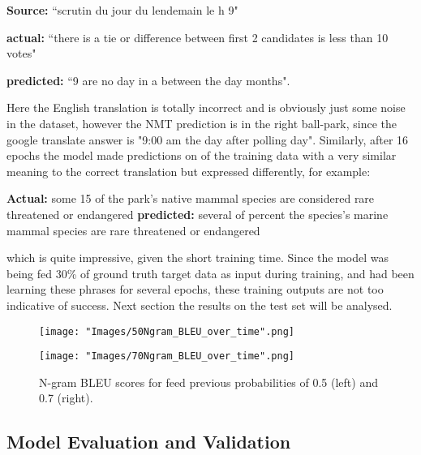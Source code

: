 \documentclass[]{article}
\begin{document}
\begin{center}
	\textbf{Source:} ``scrutin du jour du lendemain le h 9" 
	
	\textbf{actual:} ``there is a tie or difference between first 2 candidates is less than 10 votes" 
	
	\textbf{predicted:}  ``9 are no day in a between the day months".

\end{center}
Here the English translation is totally incorrect and is obviously just some noise in the dataset, however the NMT prediction is in the right ball-park, since the google translate answer is "9:00 am the day after polling day". Similarly, after 16 epochs the model made predictions on of the training data with a very similar meaning to the correct translation but expressed differently, for example:
\begin{center}
\textbf{Actual:} some 15 of the park's native mammal species are considered rare threatened or endangered 
\textbf{predicted:} several of percent the species's marine mammal species are rare threatened or endangered
\end{center}
which is quite impressive, given the short training time. Since the model was being fed 30\% of ground truth target data as input during training, and had been learning these phrases for several epochs, these training outputs are not too indicative of success. Next section the results on the test set will be analysed.
\begin{figure}[h]
	\centering
	\begin{minipage}[b]{0.48\textwidth}
		\texttt{[image: "Images/50Ngram\_BLEU\_over\_time".png]}
	\end{minipage}
	\begin{minipage}[b]{0.48\textwidth}
		\texttt{[image: "Images/70Ngram\_BLEU\_over\_time".png]}
	\end{minipage}
	\caption{N-gram BLEU scores for feed previous probabilities of 0.5 (left) and 0.7 (right). }
	\label{fig:over_time}
\end{figure}

\subsection{Model Evaluation and Validation}
\end{document}
